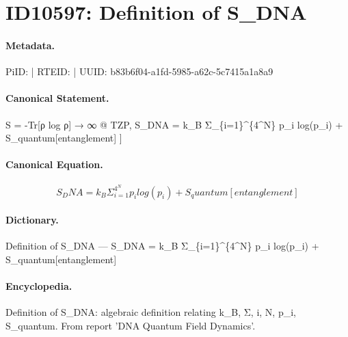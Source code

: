 \section*{ID10597: Definition of S\_DNA}
\paragraph{Metadata.}
PiID:  | RTEID:  | UUID: b83b6f04-a1fd-5985-a62c-5c7415a1a8a9

\paragraph{Canonical Statement.}
S = -Tr[ρ log ρ] → ∞ @ TZP, S\_DNA = k\_B Σ\_\{i=1\}\textasciicircum{}\{4\textasciicircum{}N\} p\_i log(p\_i) + S\_quantum[entanglement] ]

\paragraph{Canonical Equation.}
\[
S_DNA = k_B Σ_{i=1}^{4^N} p_i log(p_i) + S_quantum[entanglement]
\]

\paragraph{Dictionary.}
Definition of S\_DNA — S\_DNA = k\_B Σ\_\{i=1\}\textasciicircum{}\{4\textasciicircum{}N\} p\_i log(p\_i) + S\_quantum[entanglement]

\paragraph{Encyclopedia.}
Definition of S\_DNA: algebraic definition relating k\_B, Σ, i, N, p\_i, S\_quantum. From report 'DNA Quantum Field Dynamics'.
